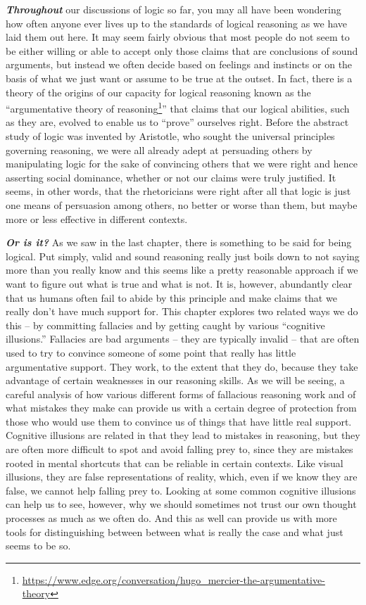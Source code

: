 \documentclass[12pt, openany]{book}
\renewcommand{\href}[2]{#2\footnote{\url{#1}}}
\begin{document}
\textbf{\emph{Throughout}} our discussions of logic so far, you may all have been wondering how often anyone ever lives up to the standards of logical reasoning as we have laid them out here. It may seem fairly obvious that most people do not seem to be either willing or able to accept only those claims that are conclusions of sound arguments, but instead we often decide based on feelings and instincts or on the basis of what we just want or assume to be true at the outset. In fact, there is a theory of the origins of our capacity for logical reasoning known as the ``\href{https://www.edge.org/conversation/hugo_mercier-the-argumentative-theory}{argumentative theory of reasoning}'' that claims that our logical abilities, such as they are, evolved to enable us to ``prove'' ourselves right. Before the abstract study of logic was invented by Aristotle, who sought the universal principles governing reasoning, we were all already adept at persuading others by manipulating logic for the sake of convincing others that we were right and hence asserting social dominance, whether or not our claims were truly justified. It seems, in other words, that the rhetoricians were right after all that logic is just one means of persuasion among others, no better or worse than them, but maybe more or less effective in different contexts.

\textbf{\emph{Or is it?}} As we saw in the last chapter, there is something to be said for being logical. Put simply, valid and sound reasoning really just boils down to not saying more than you really know and this seems like a pretty reasonable approach if we want to figure out what is true and what is not. It is, however, abundantly clear that us humans often fail to abide by this principle and make claims that we really don't have much support for. This chapter explores two related ways we do this -- by committing fallacies and by getting caught by various ``cognitive illusions.'' Fallacies are bad arguments -- they are typically invalid -- that are often used to try to convince someone of some point that really has little argumentative support. They work, to the extent that they do, because they take advantage of certain weaknesses in our reasoning skills. As we will be seeing, a careful analysis of how various different forms of fallacious reasoning work and of what mistakes they make can provide us with a certain degree of protection from those who would use them to convince us of things that have little real support. Cognitive illusions are related in that they lead to mistakes in reasoning, but they are often more difficult to spot and avoid falling prey to, since they are mistakes rooted in mental shortcuts that can be reliable in certain contexts. Like visual illusions, they are false representations of reality, which, even if we know they are false, we cannot help falling prey to. Looking at some common cognitive illusions can help us to see, however, why we should sometimes not trust our own thought processes as much as we often do. And this as well can provide us with more tools for distinguishing between between what is really the case and what just seems to be so.
\end{document}
